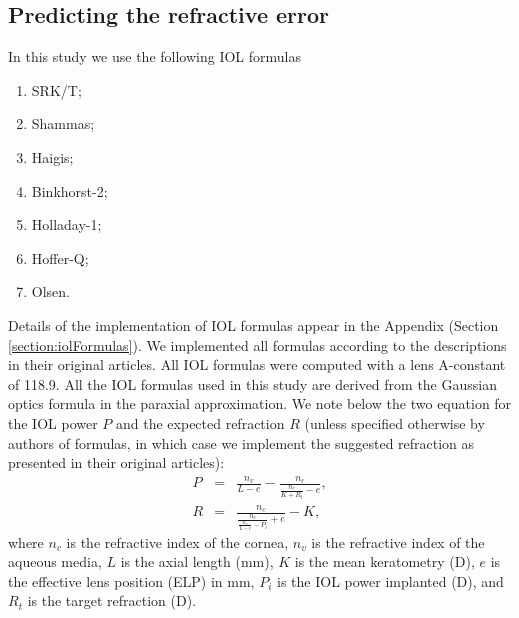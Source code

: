 \documentclass[article,twocolumn,preprint,10pt]{paper}%
\renewcommand{\(}{\left(}
\renewcommand{\)}{\right)}
\renewcommand{\[}{\left[}
\renewcommand{\]}{\right]}
\newcommand{\beq}{\begin{eqnarray}}
\newcommand{\eeq}{\end{eqnarray}}
\newcommand{\1}{\mbox{\boldmath$1$}}
\begin{document}
\subsection{Predicting the refractive error}\label{subsection:predictingRefractiveError}
In this study we use the following IOL formulas
\begin{enumerate}
	\item SRK/T;
	\item Shammas;
	\item Haigis;
	\item Binkhorst-2;
	\item Holladay-1;
	\item Hoffer-Q;
	\item Olsen.
\end{enumerate} 
Details of the implementation of IOL formulas appear in the Appendix (Section \ref{section:iolFormulas}). We implemented all formulas according to the descriptions in their original articles. All IOL formulas were computed with a lens A-constant of 118.9. 
All the IOL formulas used in this study are derived from the Gaussian optics formula in the paraxial approximation. We note below the two equation for the IOL power $P$ and the expected refraction $R$ (unless specified otherwise by authors of formulas, in which case we implement the suggested refraction as presented in their original articles):
\beq 
P &=& \frac{n_v}{L-e} - \frac{n_c}{\frac{n_c}{K+R_t}-e },\label{eq:expectedPower}\\
R &=& \frac{n_c}{\frac{n_c}{\frac{n_v}{L-e}-P_i}+e}-K,\label{eq:expectedRefraction}
\eeq 
where $n_c$ is the refractive index of the cornea, $n_v$ is the refractive index of the aqueous media, $L$ is the axial length (mm), $K$ is the mean keratometry (D), $e$ is the effective lens position (ELP) in mm, $P_i$ is the IOL power implanted (D), and $R_t$ is the target refraction (D).
\end{document}
